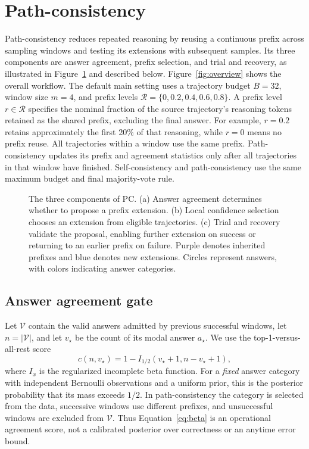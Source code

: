 \section{Path-consistency}
\label{sec:method}
Path-consistency reduces repeated reasoning by reusing a continuous prefix across sampling windows and testing its extensions with subsequent samples. Its three components are answer agreement, prefix selection, and trial and recovery, as illustrated in Figure~\ref{fig:loop} and described below. Figure~\ref{fig:overview} shows the overall workflow. The default main setting uses a trajectory budget $B=32$, window size $m=4$, and prefix levels $\mathcal R=\{0,0.2,0.4,0.6,0.8\}$. A prefix level $r\in\mathcal R$ specifies the nominal fraction of the source trajectory's reasoning tokens retained as the shared prefix, excluding the final answer. For example, $r=0.2$ retains approximately the first 20\% of that reasoning, while $r=0$ means no prefix reuse. All trajectories within a window use the same prefix. Path-consistency updates its prefix and agreement statistics only after all trajectories in that window have finished. Self-consistency and path-consistency use the same maximum budget and final majority-vote rule.

\begin{figure}[t]
\centering

\caption{The three components of PC. (a) Answer agreement determines whether to propose a prefix extension. (b) Local confidence selection chooses an extension from eligible trajectories. (c) Trial and recovery validate the proposal, enabling further extension on success or returning to an earlier prefix on failure. Purple denotes inherited prefixes and blue denotes new extensions. Circles represent answers, with colors indicating answer categories.}
\label{fig:loop}
\end{figure}

\subsection{Answer agreement gate}
Let $\mathcal V$ contain the valid answers admitted by previous successful windows, let $n=|\mathcal V|$, and let $v_\star$ be the count of its modal answer $a_\star$. We use the top-1-versus-all-rest score
\begin{equation}
 c(n,v_\star)=1-I_{1/2}(v_\star+1,n-v_\star+1),
 \label{eq:beta}
\end{equation}
where $I_x$ is the regularized incomplete beta function. For a \emph{fixed} answer category with independent Bernoulli observations and a uniform prior, this is the posterior probability that its mass exceeds $1/2$. In path-consistency the category is selected from the data, successive windows use different prefixes, and unsuccessful windows are excluded from $\mathcal V$. Thus Equation~\ref{eq:beta} is an operational agreement score, not a calibrated posterior over correctness or an anytime error bound.

